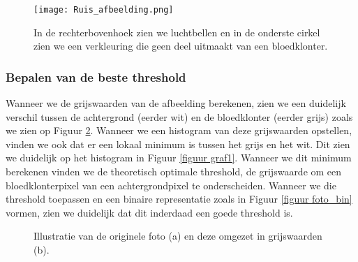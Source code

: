 \documentclass[a4paper,kulak]{kulakarticle}
\begin{document}
		\begin{figure}[H]
			\centering
			\texttt{[image: Ruis\_afbeelding.png]}	
			\caption{In de rechterbovenhoek zien we luchtbellen en in de onderste cirkel zien we een verkleuring die geen deel uitmaakt van een bloedklonter.}
			\label{figuur achtergrondverwijdering}
		\end{figure}

	\subsubsection{Bepalen van de beste threshold}
		Wanneer we de grijswaarden van de afbeelding berekenen, zien we een duidelijk verschil tussen de achtergrond (eerder wit) en de bloedklonter (eerder grijs) zoals we zien op Figuur \ref{figuur beste_threshold}. Wanneer we een histogram van deze grijswaarden opstellen, vinden we ook dat er een lokaal minimum is tussen het grijs en het wit. Dit zien we duidelijk op het histogram in Figuur \ref{figuur graf1}. Wanneer we dit minimum berekenen vinden we de theoretisch optimale threshold, de grijswaarde om een bloedklonterpixel van een achtergrondpixel te onderscheiden. Wanneer we die threshold toepassen en een binaire representatie zoals in Figuur \ref{figuur foto_bin} vormen, zien we duidelijk dat dit inderdaad een goede threshold is.

	\begin{figure}[H]
		\centering
		\qquad
		
		\caption{Illustratie van de originele foto (a) en deze omgezet in grijswaarden (b).}
		\label{figuur beste_threshold}
	\end{figure}
\end{document}
